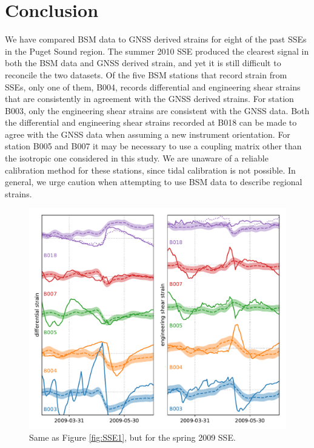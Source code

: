\documentclass[10pt,a4paper]{article}
\begin{document}
\section{Conclusion}
We have compared BSM data to GNSS derived strains for eight of the past SSEs in the Puget Sound region. The summer 2010 SSE produced the clearest signal in both the BSM data and GNSS derived strain, and yet it is still difficult to reconcile the two datasets. Of the five BSM stations that record strain from SSEs, only one of them, B004, records differential and engineering shear strains that are consistently in agreement with the GNSS derived strains. For station B003, only the engineering shear strains are consistent with the GNSS data. Both the differential and engineering shear strains recorded at B018 can be made to agree with the GNSS data when assuming a new instrument orientation. For station B005 and B007 it may be necessary to use a coupling matrix other than the isotropic one considered in this study. We are unaware of a reliable calibration method for these stations, since tidal calibration is not possible. In general, we urge caution when attempting to use BSM data to describe regional strains.    


  
 
\begin{figure}
\includegraphics{figures/SSE0.pdf}
\caption{Same as Figure \ref{fig:SSE1}, but for the spring 2009 SSE.}   
\label{fig:SSE0}
\end{figure}
\end{document}

